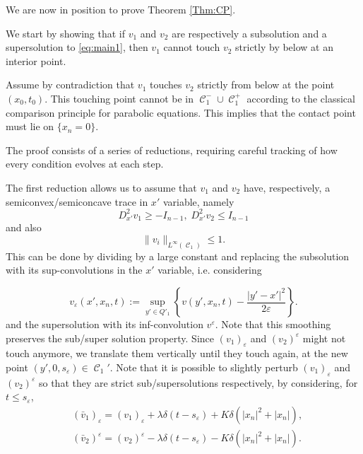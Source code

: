 \documentclass[12pt]{article}
\makeatletter
\newenvironment{customproof}[1]{%
  \par\pushQED{\qed}%
  \normalfont\topsep6pt \trivlist
  \item[\hskip\labelsep\itshape
    Proof of #1\@addpunct{.}]\ignorespaces
}{%
  \popQED\endtrivlist\@endpefalse
}
\numberwithin{Theorem}{section}
\theoremstyle{definition}
\theoremstyle{remark}
\numberwithin{equation}{section}
\DeclareMathOperator{\C}{\mathcal{C}}
\makeatother
\begin{document}
We are now in position to prove Theorem \ref{Thm:CP}.
\begin{customproof}{Theorem \ref{Thm:CP}}
We start by showing that if $v_1$ and $v_2$ are respectively a subsolution and a supersolution to \eqref{eq:main1}, then $v_1$ cannot touch $v_2$ strictly by below at an interior point.

Assume by contradiction that $v_1$ touches $v_2$ strictly from below at the point $(x_0,t_0)$. This touching point  cannot be in $\C_1^- \cup \C_1^+$ according to the classical comparison principle for parabolic equations. This implies that the contact point must lie on $\{ x_n=0\}$. 

The proof consists of a series of reductions, requiring careful tracking of how every condition evolves at each step.

    The first reduction allows us to assume that $v_1$ and $v_2$ have, respectively, a semiconvex/semiconcave trace in $x'$ variable, namely \begin{equation} \label{eq:semicon}
        D_{x'}^2 v_1 \geq -I_{n-1}, \; D_{x'}^2 v_2 \leq I_{n-1}
    \end{equation}and also \begin{equation} \label{eq:smallnorm}
        \| v_i\|_{L^\infty(\C_1)} \leq 1.
    \end{equation}
    This can be done by dividing by a large constant and replacing the subsolution with its sup-convolutions in the $x'$ variable, i.e. considering

\begin{equation}\label{eq:conv_env}
v_\varepsilon(x',x_n,t)
:=
\sup_{y'\in Q'_1}
\left\{
v(y',x_n,t)-\frac{|y'-x'|^2}{2\varepsilon}
\right\}.    
\end{equation}
and the supersolution with its inf-convolution $v^\varepsilon$. Note that this smoothing preserves the sub/super solution property. Since $(v_1)_\varepsilon$ and $(v_2)^{\varepsilon}$  might not touch anymore, we translate them vertically until they touch again, at the new point
     $(y',0,s_\varepsilon) \in \C_1'$.  Note that it is possible to slightly perturb $(v_1)_\varepsilon$ and $(v_2)^{\varepsilon}$ so that they are strict sub/supersolutions respectively, by considering, for $t\leq s_\varepsilon$, 
     \begin{align*}
         &(\bar v_1)_\varepsilon = (v_1)_{\varepsilon} +\lambda\delta(t-s_\varepsilon) +K\delta( |x_n|^2 + |x_n|),\\
         &(\bar v_2)^\varepsilon = (v_2)^\varepsilon - \lambda\delta (t -s_\varepsilon) -K \delta ( |x_n|^2 + |x_n|) .
     \end{align*}
     

\end{customproof}
\end{document}
